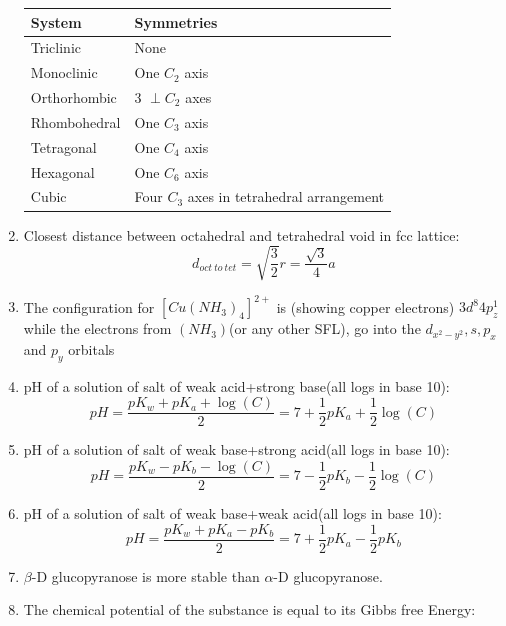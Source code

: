 \documentclass{article}
\numberwithin{equation}{section}
\numberwithin{figure}{section}
\begin{document}
\begin{enumerate}
\begin{table}[h!]
		\begin{tabular}{|l|l|}
			\hline
			System       & Symmetries                               \\ \hline
			Triclinic    & None                                     \\ \hline
			Monoclinic   & One $C_2$ axis                             \\ \hline
			Orthorhombic & 3 $\perp C_2$ axes                         \\ \hline
			Rhombohedral & One $C_3$ axis                             \\ \hline
			Tetragonal   & One $C_4$ axis                             \\ \hline
			Hexagonal    & One $C_6$ axis                             \\ \hline
			Cubic        & Four $C_3$ axes in tetrahedral arrangement \\ \hline
		\end{tabular}
		\end{table}
	\item Closest distance between octahedral and tetrahedral void in fcc lattice: $$d_{oct\ to\ tet}=\sqrt{\frac{3}{2}}r=\frac{\sqrt{3}}{4}a$$
	\item The configuration for $[Cu(NH_3)_4]^{2+}$ is (showing copper electrons) $3d^8 4p_{z}^1$ while the electrons from $(NH_3)$(or any other SFL), go into the $d_{x^2-y^2},s, p_{x}$ and $p_{y}$ orbitals 
	\item pH of a solution of salt of weak acid+strong base(all logs in base 10):
		\begin{equation}
			pH=\frac{pK_{w}+pK_{a}+\log(C)}{2}=7+\frac{1}{2}pK_{a}+\frac{1}{2}\log(C)
		\end{equation}
	\item pH of a solution of salt of weak base+strong acid(all logs in base 10):
		\begin{equation}
			pH=\frac{pK_{w}-pK_{b}-\log(C)}{2}=7-\frac{1}{2}pK_{b}-\frac{1}{2}\log (C)
		\end{equation}
	\item pH of a solution of salt of weak base+weak acid(all logs in base 10):
		\begin{equation}
			pH=\frac{pK_{w}+pK_{a}-pK_{b}}{2}=7+\frac{1}{2}pK_{a}-\frac{1}{2} pK_{b}
		\end{equation}
	\item $\beta$-D glucopyranose is more stable than $\alpha$-D glucopyranose.	
	\item The chemical potential of the substance is equal to its Gibbs free Energy:

\end{enumerate}
\end{document}
